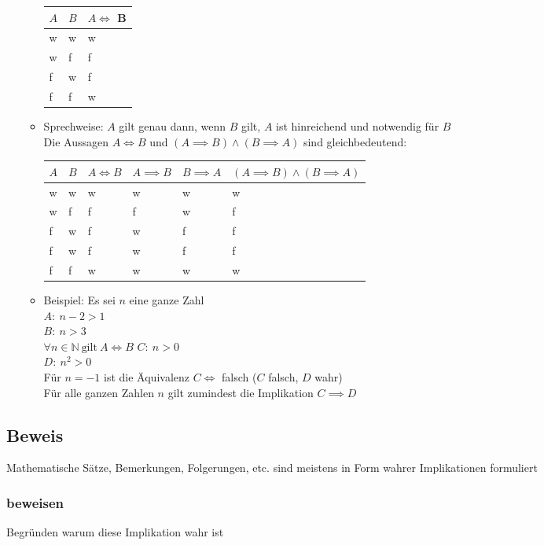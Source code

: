\documentclass[a4paper]{scrartcl}
\DeclareMathOperator{\Forall}{\forall}
\theoremstyle{definition}
\theoremstyle{plain}
\theoremstyle{plain}
\theoremstyle{remark}
\theoremstyle{remark}
\theoremstyle{remark}
\theoremstyle{remark}
\theoremstyle{remark}
\begin{document}
\begin{itemize}
\begin{itemize}
\begin{center}
\begin{tabular}{lll}
$A$ & $B$ & $A\iff$ B\\
\hline
w & w & w\\
w & f & f\\
f & w & f\\
f & f & w\\
\end{tabular}
\end{center}
\item Sprechweise: $A$ gilt genau dann, wenn $B$ gilt, $A$ ist hinreichend und notwendig für $B$ \\
       Die Aussagen $A\iff B$ und $(A\implies B)\wedge (B\implies A)$ sind gleichbedeutend:
\begin{center}
\begin{tabular}{llllll}
$A$ & $B$ & $A\iff B$ & $A\implies B$ & $B\implies A$ & $(A\implies B)\wedge (B\implies A)$\\
\hline
w & w & w & w & w & w\\
w & f & f & f & w & f\\
f & w & f & w & f & f\\
f & w & f & w & f & f\\
f & f & w & w & w & w\\
\end{tabular}
\end{center}
\item Beispiel: Es sei $n$ eine ganze Zahl \\
       $A:~n-2>1$ \\
       $B:~n>3$ \\
       $\Forall n\in\mathbb{N}~\text{gilt}~A\iff B$
       $C:~n>0$ \\
       $D:~n^2>0$ \\
       Für $n=-1$ ist die Äquivalenz $C\iff$ falsch ($C$ falsch, $D$ wahr) \\
       Für alle ganzen Zahlen $n$ gilt zumindest die Implikation $C\implies D$
\end{itemize}
\end{itemize}
\subsection{Beweis}
\label{sec-2-2}
Mathematische Sätze, Bemerkungen, Folgerungen, etc. sind meistens in Form wahrer Implikationen formuliert
\subsubsection{beweisen}
\label{sec-2-2-1}
Begründen warum diese Implikation wahr ist
\end{document}
